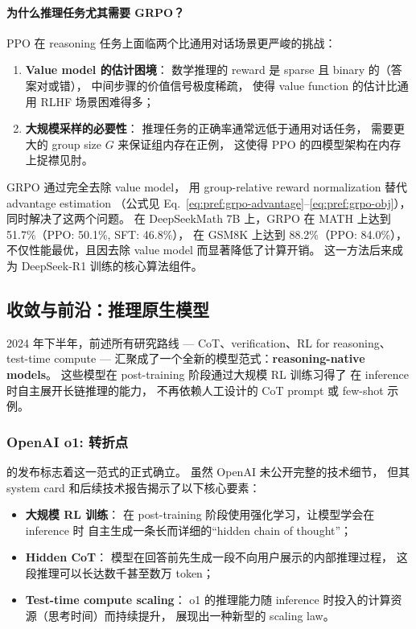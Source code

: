 \paragraph{为什么推理任务尤其需要 GRPO？}
PPO 在 reasoning 任务上面临两个比通用对话场景更严峻的挑战：
\begin{enumerate}[leftmargin=2em]
  \item \textbf{Value model 的估计困境}：
    数学推理的 reward 是 sparse 且 binary 的（答案对或错），
    中间步骤的价值信号极度稀疏，
    使得 value function 的估计比通用 RLHF 场景困难得多；
  \item \textbf{大规模采样的必要性}：
    推理任务的正确率通常远低于通用对话任务，
    需要更大的 group size $G$ 来保证组内存在正例，
    这使得 PPO 的四模型架构在内存上捉襟见肘。
\end{enumerate}

\noindent
GRPO 通过完全去除 value model，
用 group-relative reward normalization 替代 advantage estimation
（公式见 Eq.~\ref{eq:pref:grpo-advantage}--\ref{eq:pref:grpo-obj}），
同时解决了这两个问题。
在 DeepSeekMath 7B 上，GRPO 在 MATH 上达到 51.7\%（PPO: 50.1\%, SFT: 46.8\%），
在 GSM8K 上达到 88.2\%（PPO: 84.0\%），
不仅性能最优，且因去除 value model 而显著降低了计算开销。
这一方法后来成为 DeepSeek-R1 训练的核心算法组件。


\subsection{收敛与前沿：推理原生模型}
\label{sec:t4-convergence}

2024 年下半年，前述所有研究路线 --- CoT、verification、RL for reasoning、test-time compute ---
汇聚成了一个全新的模型范式：\textbf{reasoning-native models}。
这些模型在 post-training 阶段通过大规模 RL 训练习得了
在 inference 时自主展开长链推理的能力，
不再依赖人工设计的 CoT prompt 或 few-shot 示例。

\subsubsection{OpenAI o1: 转折点}
\label{sec:t4-o1}

 的发布标志着这一范式的正式确立。
虽然 OpenAI 未公开完整的技术细节，
但其 system card 和后续技术报告揭示了以下核心要素：

\begin{itemize}[leftmargin=2em]
  \item \textbf{大规模 RL 训练}：
    在 post-training 阶段使用强化学习，让模型学会在 inference 时
    自主生成一条长而详细的``hidden chain of thought''；
  \item \textbf{Hidden CoT}：
    模型在回答前先生成一段不向用户展示的内部推理过程，
    这段推理可以长达数千甚至数万 token；
  \item \textbf{Test-time compute scaling}：
    o1 的推理能力随 inference 时投入的计算资源（思考时间）而持续提升，
    展现出一种新型的 scaling law。
\end{itemize}

